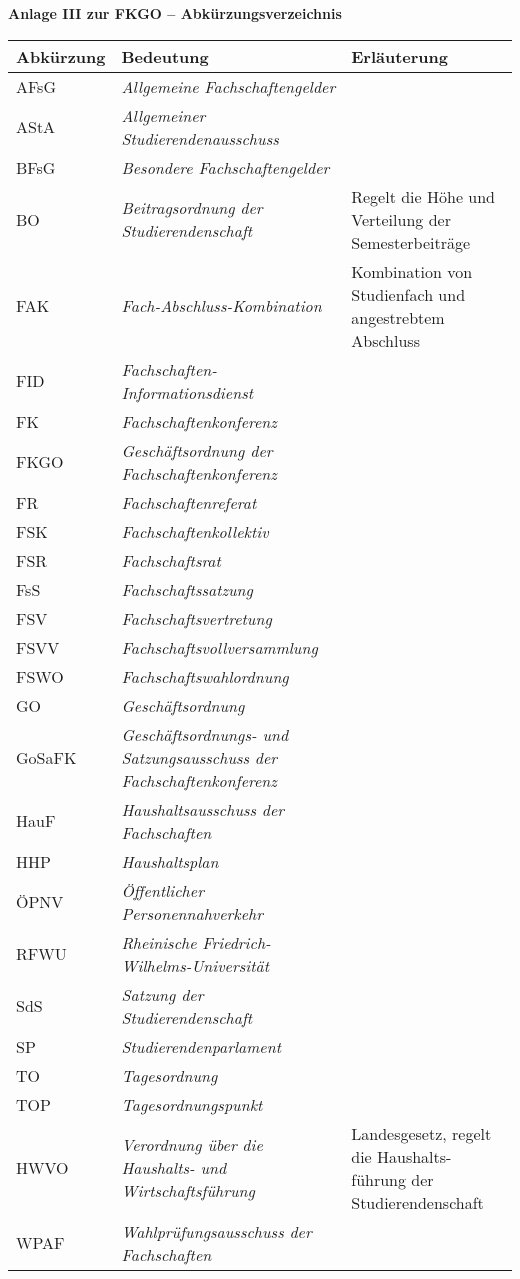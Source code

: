 \documentclass{article}
\begin{document}
\noindent
\begin{center}
	\huge \textbf{Anlage III zur FKGO -- Abkürzungsverzeichnis}
\end{center}
\vspace{2em}
\setlength\extrarowheight{2mm} \sffamily    
\begin{tabular}{L{2 cm} L{7cm} L{6cm}}
\textbf{Abkürzung} & \textbf{Bedeutung} & \textbf{Erläuterung}\\ \hline
AFsG & \textit{Allgemeine Fachschaftengelder} &  \\
AStA & \textit{Allgemeiner Studierendenausschuss} & \\
BFsG & \textit{Besondere Fachschaftengelder} & \\
BO & \textit{Beitragsordnung der Studierendenschaft} & Regelt die Höhe und Verteilung der Semesterbeiträge \\
FAK & \textit{Fach-Abschluss-Kombination} & Kombination von Studienfach und angestrebtem Abschluss\\
FID & \textit{Fachschaften-Informationsdienst} & \\
FK & \textit{Fachschaftenkonferenz} & \\
FKGO & \textit{Geschäftsordnung der Fachschaftenkonferenz} & \\
FR & \textit{Fachschaftenreferat} & \\
FSK & \textit{Fachschaftenkollektiv} & \\
FSR & \textit{Fachschaftsrat} & \\
FsS & \textit{Fachschaftssatzung}  &  \\
FSV & \textit{Fachschaftsvertretung} & \\
FSVV & \textit{Fachschaftsvollversammlung} &  \\
FSWO & \textit{Fachschaftswahlordnung} &  \\
GO & \textit{Geschäftsordnung} &  \\
GoSaFK & \textit{Geschäftsordnungs- und Satzungsausschuss der Fachschaftenkonferenz} &  \\
HauF & \textit{Haushaltsausschuss der Fachschaften} &  \\
HHP & \textit{Haushaltsplan} &  \\   
ÖPNV & \textit{Öffentlicher Personennahverkehr} &  \\
RFWU &\textit{Rheinische Friedrich-Wilhelms-Universität} &  \\
SdS & \textit{Satzung der Studierendenschaft} &  \\
SP & \textit{Studierendenparlament} &  \\
TO & \textit{Tagesordnung} &  \\
TOP & \textit{Tagesordnungspunkt} &  \\
HWVO &\textit{Verordnung über die Haushalts- und Wirtschaftsführung}  & Landesgesetz, regelt die Haushalts- führung der Studierendenschaft \\
WPAF & \textit{Wahlprüfungsausschuss der Fachschaften} &  \\
\end{tabular}
\end{document}
